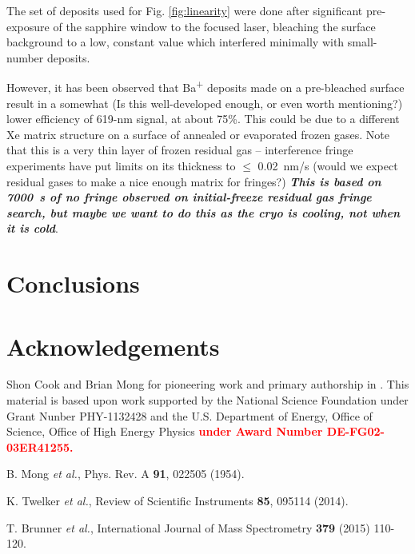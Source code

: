 \documentclass[aps,pra,reprint,superscriptaddress]{revtex4-1}
\begin{document}
The set of deposits used for Fig. \ref{fig:linearity} were done after significant pre-exposure of the sapphire window to the focused laser, bleaching the surface background to a low, constant value which interfered minimally with small-number deposits.

However, it has been observed that Ba\textsuperscript{+} deposits made on a pre-bleached surface result in a somewhat {\color{red}(Is this well-developed enough, or even worth mentioning?)} lower efficiency of 619-nm signal, at about 75\%.  This could be due to a different Xe matrix structure on a surface of annealed or evaporated frozen gases.  Note that this is a very thin layer of frozen residual gas -- interference fringe experiments have put limits on its thickness to $\leq$ 0.02~nm/s ({\color{red}would we expect residual gases to make a nice enough matrix for fringes?}) \textbf{\color{red}\emph{This is based on 7000~s of no fringe observed on initial-freeze residual gas fringe search, but maybe we want to do this as the cryo is cooling, not when it is cold}}.

\section{Conclusions}

\section*{Acknowledgements}

Shon Cook and Brian Mong for pioneering work and primary authorship in \cite{Mong2015}.  This material is based upon work supported by the National Science Foundation under Grant Nunber PHY-1132428 and the U.S. Department of Energy, Office of Science, Office of High Energy Physics \textbf{\textcolor{red}{under Award Number DE-FG02-03ER41255.}}

%
\begin{thebibliography}{00}

 B. Mong \emph{ et al.}, Phys. Rev. A \textbf{91}, 022505 (1954).

 K. Twelker \emph{ et al.}, Review of Scientific Instruments \textbf{85}, 095114 (2014).

 T. Brunner \emph{ et al.}, International Journal of Mass Spectrometry {\color{red}\textbf{379} (2015) 110-120.}

\end{thebibliography}
\end{document}
